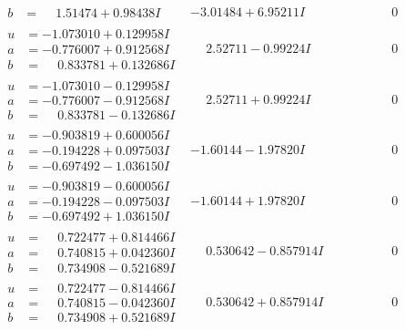 \documentclass[1p]{elsarticle_modified}
\theoremstyle{definition}
\begin{document}
$$\begin{array}{c|c|c}
\begin{aligned}
b &= \phantom{-}1.51474 + 0.98438 I\end{aligned}
 & -3.01484 + 6.95211 I & \phantom{-0.000000 } 0 \\ \hline\begin{aligned}
u &= -1.073010 + 0.129958 I \\
a &= -0.776007 + 0.912568 I \\
b &= \phantom{-}0.833781 + 0.132686 I\end{aligned}
 & \phantom{-}2.52711 - 0.99224 I & \phantom{-0.000000 } 0 \\ \hline\begin{aligned}
u &= -1.073010 - 0.129958 I \\
a &= -0.776007 - 0.912568 I \\
b &= \phantom{-}0.833781 - 0.132686 I\end{aligned}
 & \phantom{-}2.52711 + 0.99224 I & \phantom{-0.000000 } 0 \\ \hline\begin{aligned}
u &= -0.903819 + 0.600056 I \\
a &= -0.194228 + 0.097503 I \\
b &= -0.697492 - 1.036150 I\end{aligned}
 & -1.60144 - 1.97820 I & \phantom{-0.000000 } 0 \\ \hline\begin{aligned}
u &= -0.903819 - 0.600056 I \\
a &= -0.194228 - 0.097503 I \\
b &= -0.697492 + 1.036150 I\end{aligned}
 & -1.60144 + 1.97820 I & \phantom{-0.000000 } 0 \\ \hline\begin{aligned}
u &= \phantom{-}0.722477 + 0.814466 I \\
a &= \phantom{-}0.740815 + 0.042360 I \\
b &= \phantom{-}0.734908 - 0.521689 I\end{aligned}
 & \phantom{-}0.530642 - 0.857914 I & \phantom{-0.000000 } 0 \\ \hline\begin{aligned}
u &= \phantom{-}0.722477 - 0.814466 I \\
a &= \phantom{-}0.740815 - 0.042360 I \\
b &= \phantom{-}0.734908 + 0.521689 I\end{aligned}
 & \phantom{-}0.530642 + 0.857914 I & \phantom{-0.000000 } 0 \\ \hline\begin{aligned}

\end{aligned}
\end{array}$$
\end{document}
